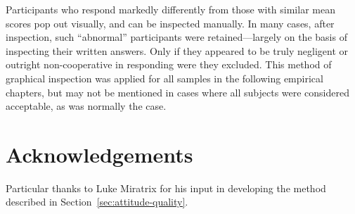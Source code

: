 Participants who respond markedly differently from those with similar mean
scores pop out visually, and can be inspected manually. In many cases, after
inspection, such “abnormal” participants were retained---largely on the basis of
inspecting their written answers. Only if they appeared to be truly negligent or
outright non-cooperative in responding were they excluded. This method of
graphical inspection was applied for all samples in the following empirical
chapters, but may not be mentioned in cases where all subjects were considered
acceptable, as was normally the case.


\section*{Acknowledgements}

Particular thanks to Luke Miratrix for his input in developing the method
described in Section~\ref{sec:attitude-quality}.
